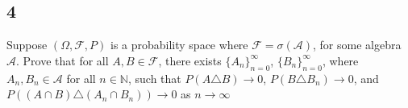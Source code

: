 \documentclass[12pt]{article}
\begin{document}

\subsection*{4}
\begin{tcolorbox}
  Suppose $(\Omega, \mathcal{F}, P)$ is a probability space where $\mathcal{F} = \sigma(\mathcal{A})$, for some algebra $\mathcal{A}$. Prove that for all $A, B \in \mathcal{F}$, there exists $\{ A_n \}_{n=0}^{\infty}$, $\{ B_n \}_{n=0}^{\infty}$, where $A_n, B_n \in \mathcal{A}$ for all $n \in \mathbb{N}$, such that $P(A \triangle B) \rightarrow 0$, $P(B\triangle B_n) \rightarrow 0$, and $P((A\cap B) \triangle (A_n \cap B_n)) \rightarrow 0$ as $n \rightarrow \infty$
\end{tcolorbox}
\end{document}

